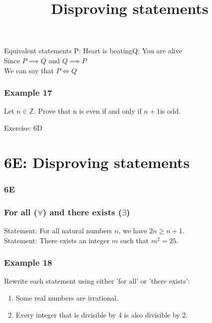 \documentclass{beamer}
\begin{document}
\begin{frame}{Equivalent statements}
    P: Heart is beating\quad Q: You are alive\\
    Since $P \implies Q$ and $Q \implies P$\\
    We can say that $P \iff Q$
\end{frame}

\begin{frame}[t]
    \frametitle{Example 17}
    Let $n \in \mathbb{Z}$. Prove that n is even if and only if $n + 1 $is odd.\\
\end{frame}

\begin{frame}{Exercise: 6D}
\end{frame}

\section{6E:  Disproving statements}
\begin{frame}
    \frametitle{6E}
    \begin{center}
        \title{Disproving statements}
        \maketitle
    \end{center}
\end{frame}

\begin{frame}
    \frametitle{For all ($\forall$) and there exists ($\exists$)}
    Statement: For all natural numbers $n$, we have $2n \geq n + 1$.\\
    Statement: There exists an integer $m$ such that $m^2 = 25$.
\end{frame}

\begin{frame}[t]
    \frametitle{Example 18}
    Rewrite each statement using either 'for all' or 'there exists':\\
    \begin{enumerate}
        \item Some real numbers are irrational.
        \item Every integer that is divisible by 4 is also divisible by 2.
    \end{enumerate}
\end{frame}
\end{document}
